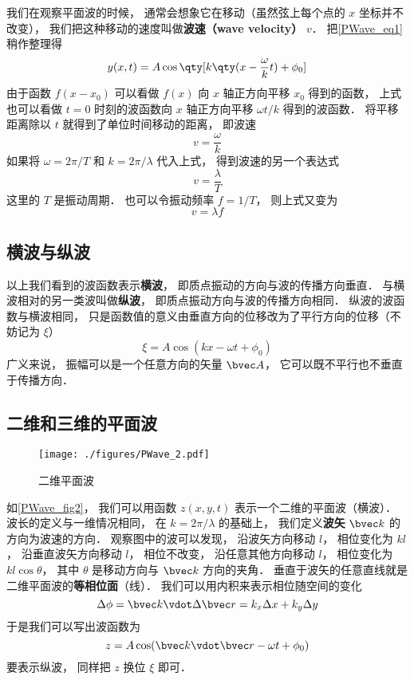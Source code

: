 我们在观察平面波的时候， 通常会想象它在移动（虽然弦上每个点的 $x$ 坐标并不改变）， 我们把这种移动的速度叫做\textbf{波速（wave velocity）} $v$． 把\autoref{PWave_eq1} 稍作整理得
\begin{equation}
y(x, t) = A\cos \qty[k \qty(x - \frac{\omega}{k} t) + \phi_0]
\end{equation}
由于函数 $f(x - x_0)$ 可以看做 $f(x)$ 向 $x$ 轴正方向平移 $x_0$ 得到的函数， 上式也可以看做 $t = 0$ 时刻的波函数向 $x$ 轴正方向平移 $\omega t/k$ 得到的波函数． 将平移距离除以 $t$ 就得到了单位时间移动的距离， 即波速
\begin{equation}
v = \frac{\omega}{k}
\end{equation}
如果将 $\omega = 2\pi/T$ 和 $k = 2\pi/\lambda$ 代入上式， 得到波速的另一个表达式
\begin{equation}
v = \frac{\lambda}{T}
\end{equation}
这里的 $T$ 是振动周期． 也可以令振动频率 $f = 1/T$， 则上式又变为
\begin{equation}
v = \lambda f
\end{equation}

\subsection{横波与纵波}
以上我们看到的波函数表示\textbf{横波}， 即质点振动的方向与波的传播方向垂直． 与横波相对的另一类波叫做\textbf{纵波}， 即质点振动方向与波的传播方向相同． 纵波的波函数与横波相同， 只是函数值的意义由垂直方向的位移改为了平行方向的位移（不妨记为 $\xi$）
\begin{equation}
\xi = A \cos(k x - \omega t + \phi_0)
\end{equation}
广义来说， 振幅可以是一个任意方向的矢量 $\bvec A$， 它可以既不平行也不垂直于传播方向．

\subsection{二维和三维的平面波}

\begin{figure}[ht]
\centering
\texttt{[image: ./figures/PWave\_2.pdf]}
\caption{二维平面波} \label{PWave_fig2}
\end{figure}

如\autoref{PWave_fig2}， 我们可以用函数 $z(x,y,t)$ 表示一个二维的平面波（横波）． 波长的定义与一维情况相同， 在 $k = 2\pi/\lambda$ 的基础上， 我们定义\textbf{波矢} $\bvec k$ 的方向为波速的方向．
观察图中的波可以发现， 沿波矢方向移动 $l$， 相位变化为 $kl$， 沿垂直波矢方向移动 $l$， 相位不改变， 沿任意其他方向移动 $l$， 相位变化为 $kl\cos\theta$， 其中 $\theta$ 是移动方向与 $\bvec k$ 方向的夹角． 垂直于波矢的任意直线就是二维平面波的\textbf{等相位面}（线）． 我们可以用内积来表示相位随空间的变化
\begin{equation}
\Delta\phi = \bvec k \vdot \Delta\bvec r = k_x \Delta x + k_y \Delta y
\end{equation}
于是我们可以写出波函数为
\begin{equation}\label{PWave_eq8}
z = A \cos(\bvec k \vdot \bvec r - \omega t + \phi_0)
\end{equation}
要表示纵波， 同样把 $z$ 换位 $\xi$ 即可．

